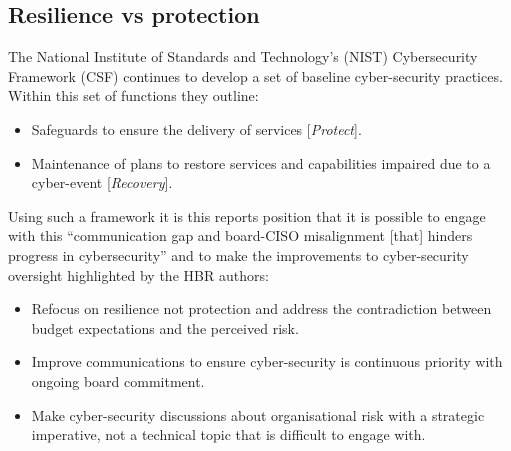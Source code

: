 \subsection{Resilience vs protection}

The National Institute of Standards and Technology's (NIST) Cybersecurity Framework (CSF) \autocite{NIST:2018} continues to develop a set of baseline
cyber-security practices.  Within this set of functions they outline:

\begin{itemize}
\item Safeguards to ensure the delivery of services [\textit{Protect}].
\item Maintenance of plans to restore services and capabilities impaired due to a cyber-event [\textit{Recovery}].
\end{itemize}
  
Using such a framework it is this reports position that it is possible to engage with this
\enquote{communication gap and board-CISO misalignment [that] hinders progress in cybersecurity}
and to make the improvements to cyber-security oversight highlighted by the HBR authors:

\begin{itemize}
\item Refocus on resilience not protection and address the contradiction between budget expectations and the perceived risk. 
\item Improve communications to ensure cyber-security is continuous priority with ongoing board commitment.
\item Make cyber-security discussions about organisational risk with a strategic imperative, not a technical topic that is difficult to engage with. 
\end{itemize}





